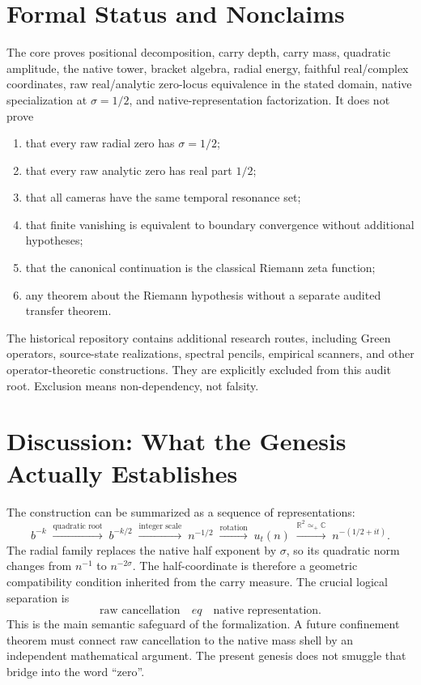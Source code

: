\documentclass[11pt,a4paper]{article}
\begin{document}
\section{Formal Status and Nonclaims}
The core proves positional decomposition, carry depth, carry mass, quadratic amplitude, the native tower, bracket algebra, radial energy, faithful real/complex coordinates, raw real/analytic zero-locus equivalence in the stated domain, native specialization at $\sigma=1/2$, and native-representation factorization.
It does not prove
\begin{enumerate}
\item that every raw radial zero has $\sigma=1/2$;
\item that every raw analytic zero has real part $1/2$;
\item that all cameras have the same temporal resonance set;
\item that finite vanishing is equivalent to boundary convergence without additional hypotheses;
\item that the canonical continuation is the classical Riemann zeta function;
\item any theorem about the Riemann hypothesis without a separate audited transfer theorem.
\end{enumerate}
The historical repository contains additional research routes, including Green operators, source-state realizations, spectral pencils, empirical scanners, and other operator-theoretic constructions. They are explicitly excluded from this audit root. Exclusion means non-dependency, not falsity.
\section{Discussion: What the Genesis Actually Establishes}
The construction can be summarized as a sequence of representations:
\[ b^{-k}\;\xrightarrow{\text{quadratic root}}\;b^{-k/2}\;\xrightarrow{\text{integer scale}}\;n^{-1/2}\;\xrightarrow{\text{rotation}}\;u_t(n)\;\xrightarrow{\mathbb R^2\simeq_+\mathbb C}\;n^{-(1/2+it)}. \]
The radial family replaces the native half exponent by $\sigma$, so its quadratic norm changes from $n^{-1}$ to $n^{-2\sigma}$. The half-coordinate is therefore a geometric compatibility condition inherited from the carry measure.
The crucial logical separation is
\[ \boxed{\text{raw cancellation}\quad
eq\quad\text{native representation}.} \]
This is the main semantic safeguard of the formalization. A future confinement theorem must connect raw cancellation to the native mass shell by an independent mathematical argument. The present genesis does not smuggle that bridge into the word ``zero''.
\appendix
\end{document}
